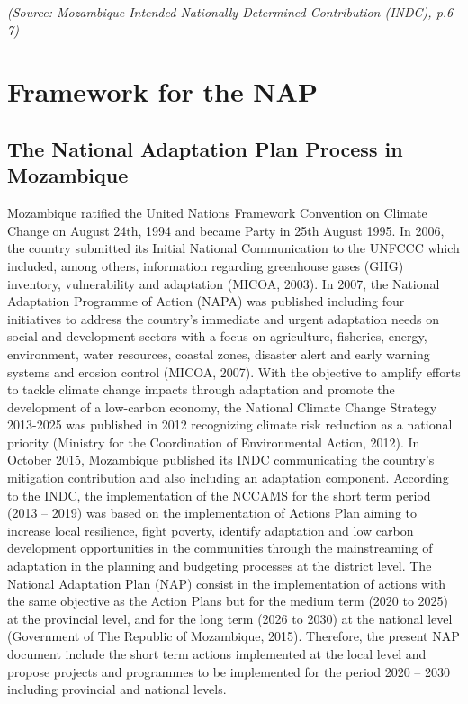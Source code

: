 \documentclass[
]{book}
\begin{document}
\emph{(Source: Mozambique Intended Nationally Determined Contribution (INDC), p.6-7)}

\hypertarget{framework-for-the-nap}{%
\section{Framework for the NAP}\label{framework-for-the-nap}}

\hypertarget{the-national-adaptation-plan-process-in-mozambique}{%
\subsection{The National Adaptation Plan Process in Mozambique}\label{the-national-adaptation-plan-process-in-mozambique}}

Mozambique ratified the United Nations Framework Convention on Climate Change on August 24th, 1994 and became Party in 25th August 1995. In 2006, the country submitted its Initial National Communication to the UNFCCC which included, among others, information regarding greenhouse gases (GHG) inventory, vulnerability and adaptation (MICOA, 2003). In 2007, the National Adaptation Programme of Action (NAPA) was published including four initiatives to address the country's immediate and urgent adaptation needs on social and development sectors with a focus on agriculture, fisheries, energy, environment, water resources, coastal zones, disaster alert and early warning systems and erosion control (MICOA, 2007). With the objective to amplify efforts to tackle climate change impacts through adaptation and promote the development of a low-carbon economy, the National Climate Change Strategy 2013-2025 was published in 2012 recognizing climate risk reduction as a national priority (Ministry for the Coordination of Environmental Action, 2012). In October 2015, Mozambique published its INDC communicating the country's mitigation contribution and also including an adaptation component. According to the INDC, the implementation of the NCCAMS for the short term period (2013 -- 2019) was based on the implementation of Actions Plan aiming to increase local resilience, fight poverty, identify adaptation and low carbon development opportunities in the communities through the mainstreaming of adaptation in the planning and budgeting processes at the district level. The National Adaptation Plan (NAP) consist in the implementation of actions with the same objective as the Action Plans but for the medium term (2020 to 2025) at the provincial level, and for the long term (2026 to 2030) at the national level (Government of The Republic of Mozambique, 2015). Therefore, the present NAP document include the short term actions implemented at the local level and propose projects and programmes to be implemented for the period 2020 -- 2030 including provincial and national levels.
\end{document}
